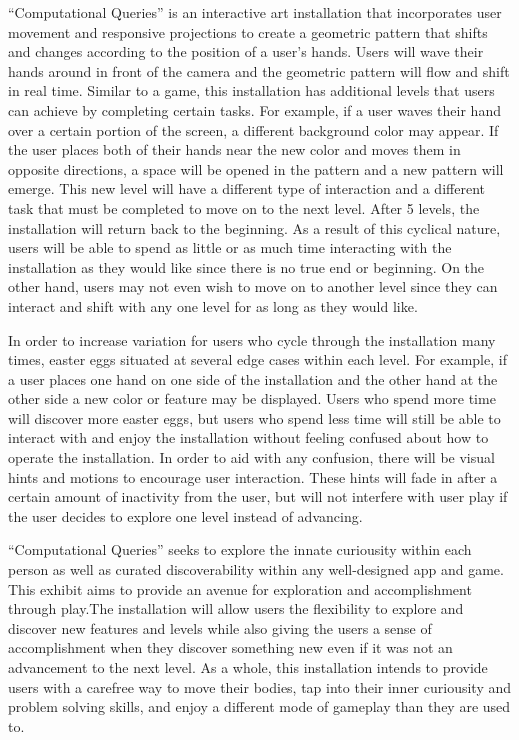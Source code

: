 \documentclass[10pt,twocolumn]{article}
\begin{document}
``Computational Queries'' is an interactive art installation that incorporates user movement and responsive projections to create a geometric pattern that shifts and changes according to the position of a user's hands.  Users will wave their hands around in front of the camera and the geometric pattern will flow and shift in real time. Similar to a game, this installation has additional levels that users can achieve by completing certain tasks.  For example, if a user waves their hand over a certain portion of the screen, a different background color may appear.  If the user places both of their hands near the new color and moves them in opposite directions, a space will be opened in the pattern and a new pattern will emerge.  This new level will have a different type of interaction and a different task that must be completed to move on to the next level.  After 5 levels, the installation will return back to the beginning.  As a result of this cyclical nature, users will be able to spend as little or as much time interacting with the installation as they would like since there is no true end or beginning. On the other hand, users may not even wish to move on to another level since they can interact and shift with any one level for as long as they would like.  

In order to increase variation for users who cycle through the installation many times, easter eggs situated at several edge cases within each level.  For example, if a user places one hand on one side of the installation and the other hand at the other side a new color or feature may be displayed.  Users who spend more time will discover more easter eggs, but users who spend less time will still be able to interact with and enjoy the installation without feeling confused about how to operate the installation.  In order to aid with any confusion, there will be visual hints and motions to encourage user interaction. These hints will fade in after a certain amount of inactivity from the user, but will not interfere with user play if the user decides to explore one level instead of advancing. 

``Computational Queries'' seeks to explore the innate curiousity within each person as well as curated discoverability within any well-designed app and game. This exhibit aims to provide an avenue for exploration and accomplishment through play.The installation will allow users the flexibility to explore and discover new features and levels while also giving the users a sense of accomplishment when they discover something new even if it was not an advancement to the next level. As a whole, this installation intends to provide users with a carefree way to move their bodies, tap into their inner curiousity and problem solving skills, and enjoy a different mode of gameplay than they are used to. 
\end{document}
